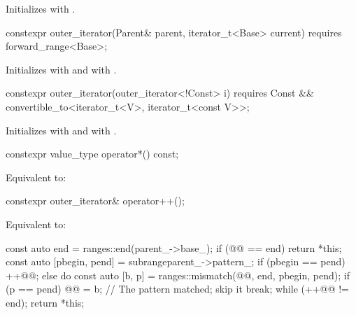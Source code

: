 \begin{itemdescr}
\pnum
\effects
Initializes  with .
\end{itemdescr}

%
\begin{itemdecl}
constexpr outer_iterator(Parent& parent, iterator_t<Base> current)
  requires forward_range<Base>;
\end{itemdecl}

\begin{itemdescr}
\pnum
\effects
Initializes  with 
and  with .
\end{itemdescr}

%
\begin{itemdecl}
constexpr outer_iterator(outer_iterator<!Const> i)
  requires Const && convertible_to<iterator_t<V>, iterator_t<const V>>;
\end{itemdecl}

\begin{itemdescr}
\pnum
\effects
Initializes  with  and
 with .
\end{itemdescr}

%
\begin{itemdecl}
constexpr value_type operator*() const;
\end{itemdecl}

\begin{itemdescr}
\pnum
\effects
Equivalent to: 
\end{itemdescr}

%
\begin{itemdecl}
constexpr outer_iterator& operator++();
\end{itemdecl}

\begin{itemdescr}
\pnum
\effects
Equivalent to:
\begin{codeblock}
const auto end = ranges::end(parent_->base_);
if (@@ == end) return *this;
const auto [pbegin, pend] = subrange{parent_->pattern_};
if (pbegin == pend) ++@@;
else {
  do {
    const auto [b, p] = ranges::mismatch(@@, end, pbegin, pend);
    if (p == pend) {
      @@ = b;  // The pattern matched; skip it
      break;
    }
  } while (++@@ != end);
}
return *this;
\end{codeblock}
\end{itemdescr}

